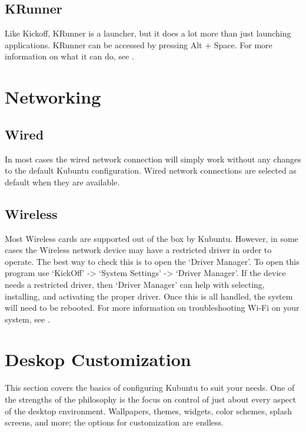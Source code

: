 \documentclass[letterpaper,10pt,english]{sphinxmanual}
\begin{document}
\subsection{KRunner}
\label{\detokenize{docs/basic:krunner}}
Like Kickoff, KRunner is a launcher, but it does a lot more than just launching applications. KRunner can be accessed by pressing Alt + Space. For more information on what it can do, see .


\section{Networking}
\label{\detokenize{docs/basic:networking}}


\subsection{Wired}
\label{\detokenize{docs/basic:wired}}
In most cases the wired network connection will simply work without any changes to the default Kubuntu configuration. Wired network connections are selected as default when they are available.


\subsection{Wireless}
\label{\detokenize{docs/basic:wireless}}
Most Wireless cards are supported out of the box by Kubuntu. However, in some cases the Wireless network device may have a restricted driver in order to operate. The best way to check this is to open the ‘Driver Manager’. To open this program use ‘KickOff’ -\textgreater{} ‘System Settings’ -\textgreater{} ‘Driver Manager’. If the device needs a restricted driver, then ‘Driver Manager’ can help with selecting, installing, and activating the proper driver. Once this is all handled, the system will need to be rebooted. For more information on troubleshooting Wi-Fi on your system, see .


\section{Deskop Customization}
\label{\detokenize{docs/basic:deskop-customization}}
This section covers the basics of configuring Kubuntu to suit your needs. One of the strengths of the  philosophy is the focus on control of just about every aspect of the desktop environment. Wallpapers, themes, widgets, color schemes, splash screens, and more; the options for customization are endless.
\end{document}

